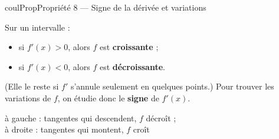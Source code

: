 \documentclass[11pt,a4paper]{article}
\makeatletter
\newcommand{\lycee@repere}[4]{%
  \draw[grille,step=1] (#1,#2) grid (#3,#4);
  \draw[-{Stealth[length=2mm]},thick] (#1,0)--({#3+0.4},0) node[below left=-1pt]{$x$};
  \draw[-{Stealth[length=2mm]},thick] (0,#2)--(0,{#4+0.4}) node[below left=-1pt]{$y$};
  \node[below left,font=\scriptsize,inner sep=1.5pt] at (0,0) {$0$};}
\newcommand{\lycee@gradx}[1]{\foreach \k/\l in {#1}{%
  \draw (\k,0.07)--(\k,-0.07) node[below,font=\scriptsize,inner sep=1.5pt]{$\l$};}}
\newcommand{\lycee@grady}[1]{\foreach \k/\l in {#1}{%
  \draw (0.07,\k)--(-0.07,\k) node[left,font=\scriptsize,inner sep=1.5pt]{$\l$};}}
\providecommand{\repere}{\lycee@repere}%
\providecommand{\gradx}{\lycee@gradx}%
\providecommand{\grady}{\lycee@grady}%
\newcounter{lycee@signet}
\newcommand{\signet}[3][]{\stepcounter{lycee@signet}%
  \edef\lycee@dest{\if\relax\detokenize{#1}\relax
    signet.\arabic{lycee@signet}\else#1\fi}%
  \hypertarget{\lycee@dest}{}\bookmark[level=#2,dest=\lycee@dest]{#3}}
\newenvironment{proprietebox}[1][Propriété]%
  {\begin{boitecours}[phantom={\signet{2}{#1}}]{coulProp}{#1}}{\end{boitecours}}
\makeatother
\begin{document}
\begin{proprietebox}[Propriété 8 --- Signe de la dérivée et variations]
\begin{minipage}[c]{0.6\linewidth}\raggedright
Sur un intervalle :
\begin{itemize}
  \item si $f'(x)>0$, alors $f$ est \textbf{croissante} ;
  \item si $f'(x)<0$, alors $f$ est \textbf{décroissante}.
\end{itemize}
(Elle le reste si $f'$ s'annule seulement en quelques points.)
Pour trouver les variations de $f$, on étudie donc le \textbf{signe} de $f'(x)$.
\end{minipage}\hfill
\begin{minipage}[c]{0.36\linewidth}\centering
{}\par
{\footnotesize à gauche : tangentes qui descendent, $f$ décroît ;\\
à droite : tangentes qui montent, $f$ croît}
\end{minipage}
\end{proprietebox}
\end{document}

